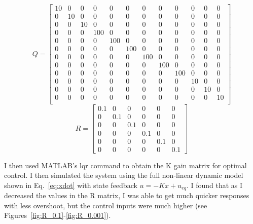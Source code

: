 \documentclass{article}
\begin{document}
\begin{equation}\label{eq:Q}
Q=
  \begin{bmatrix}
  10 & 0 & 0 & 0 & 0 & 0 & 0 & 0 & 0 & 0 & 0 & 0 \\
  0 & 10 & 0 & 0 & 0 & 0 & 0 & 0 & 0 & 0 & 0 & 0 \\
  0 & 0 & 10 & 0 & 0 & 0 & 0 & 0 & 0 & 0 & 0 & 0 \\
  0 & 0 & 0 & 100 & 0 & 0 & 0 & 0 & 0 & 0 & 0 & 0 \\
  0 & 0 & 0 & 0 & 100 & 0 & 0 & 0 & 0 & 0 & 0 & 0 \\
  0 & 0 & 0 & 0 & 0 & 100 & 0 & 0 & 0 & 0 & 0 & 0 \\
  0 & 0 & 0 & 0 & 0 & 0 & 100 & 0 & 0 & 0 & 0 & 0 \\
  0 & 0 & 0 & 0 & 0 & 0 & 0 & 100 & 0 & 0 & 0 & 0 \\
  0 & 0 & 0 & 0 & 0 & 0 & 0 & 0 & 100 & 0 & 0 & 0 \\
  0 & 0 & 0 & 0 & 0 & 0 & 0 & 0 & 0 & 10 & 0 & 0 \\
  0 & 0 & 0 & 0 & 0 & 0 & 0 & 0 & 0 & 0 & 10 & 0 \\
  0 & 0 & 0 & 0 & 0 & 0 & 0 & 0 & 0 & 0 & 0 & 10 \\
  \end{bmatrix}
\end{equation}
\begin{equation}\label{eq:R}
R=
  \begin{bmatrix}
  0.1 & 0 & 0 & 0 & 0 & 0 \\
  0 & 0.1 & 0 & 0 & 0 & 0 \\
  0 & 0 & 0.1 & 0 & 0 & 0 \\
  0 & 0 & 0 & 0.1 & 0 & 0 \\
  0 & 0 & 0 & 0 & 0.1 & 0 \\
  0 & 0 & 0 & 0 & 0 & 0.1 
  \end{bmatrix}
\end{equation}

I then used MATLAB's lqr command to obtain the K gain matrix for optimal control. I then simulated the system using the full non-linear dynamic model shown in Eq.~\ref{eq:xdot} with state feedback $u = -Kx + u_{eq}$. I found that as I decreased the values in the R matrix, I was able to get much quicker responses with less overshoot, but the control inputs were much higher (see Figures~\ref{fig:R_0.1}-\ref{fig:R_0.001}).
\end{document}
